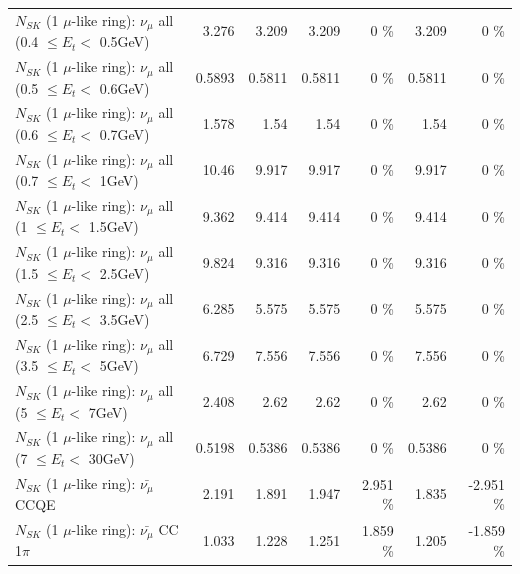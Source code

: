 \begin{table}
\begin{tabular}{| l | r | r | r  r | r  r |}
       $N_{SK}$ (1 $\mu$-like ring): $\nu_{\mu}$ all (0.4 $\leq E_{t} <$ 0.5GeV) &           3.276 &           3.209 &           3.209 &        0 \%  &           3.209 &        0 \%  \\ 
       $N_{SK}$ (1 $\mu$-like ring): $\nu_{\mu}$ all (0.5 $\leq E_{t} <$ 0.6GeV) &          0.5893 &          0.5811 &          0.5811 &        0 \%  &          0.5811 &        0 \%  \\ 
       $N_{SK}$ (1 $\mu$-like ring): $\nu_{\mu}$ all (0.6 $\leq E_{t} <$ 0.7GeV) &           1.578 &            1.54 &            1.54 &        0 \%  &            1.54 &        0 \%  \\ 
         $N_{SK}$ (1 $\mu$-like ring): $\nu_{\mu}$ all (0.7 $\leq E_{t} <$ 1GeV) &           10.46 &           9.917 &           9.917 &        0 \%  &           9.917 &        0 \%  \\ 
         $N_{SK}$ (1 $\mu$-like ring): $\nu_{\mu}$ all (1 $\leq E_{t} <$ 1.5GeV) &           9.362 &           9.414 &           9.414 &        0 \%  &           9.414 &        0 \%  \\ 
       $N_{SK}$ (1 $\mu$-like ring): $\nu_{\mu}$ all (1.5 $\leq E_{t} <$ 2.5GeV) &           9.824 &           9.316 &           9.316 &        0 \%  &           9.316 &        0 \%  \\ 
       $N_{SK}$ (1 $\mu$-like ring): $\nu_{\mu}$ all (2.5 $\leq E_{t} <$ 3.5GeV) &           6.285 &           5.575 &           5.575 &        0 \%  &           5.575 &        0 \%  \\ 
         $N_{SK}$ (1 $\mu$-like ring): $\nu_{\mu}$ all (3.5 $\leq E_{t} <$ 5GeV) &           6.729 &           7.556 &           7.556 &        0 \%  &           7.556 &        0 \%  \\ 
           $N_{SK}$ (1 $\mu$-like ring): $\nu_{\mu}$ all (5 $\leq E_{t} <$ 7GeV) &           2.408 &            2.62 &            2.62 &        0 \%  &            2.62 &        0 \%  \\ 
          $N_{SK}$ (1 $\mu$-like ring): $\nu_{\mu}$ all (7 $\leq E_{t} <$ 30GeV) &          0.5198 &          0.5386 &          0.5386 &        0 \%  &          0.5386 &        0 \%  \\ 
\hline
\hline
\hline
                              $N_{SK}$ (1 $\mu$-like ring): $\bar{\nu_\mu}$ CCQE &           2.191 &           1.891 &           1.947 &    2.951 \%  &           1.835 &   -2.951 \%  \\ 
                         $N_{SK}$ (1 $\mu$-like ring): $\bar{\nu_\mu}$ CC 1$\pi$ &           1.033 &           1.228 &           1.251 &    1.859 \%  &           1.205 &   -1.859 \%  \\ 

\end{tabular}
\end{table}
